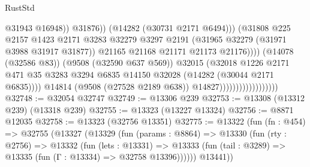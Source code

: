 \begin{lexlean}{RustStd}
\begin{coremodule}
                                                          @31943
                                                          @16948))
                                                      @31876))
                                                  (@14282 (@30731 @2171 @6494)))
                                                (@31808
                                                  @225
                                                  @2157
                                                  @1423
                                                  @2171
                                                  @3283
                                                  @32279
                                                  @3297
                                                  @2191
                                                  (@31965 @32279 (@31971 @3988 @31917 @31877))
                                                  @21165
                                                  @21168
                                                  @21171
                                                  @21173
                                                  @21176))))
                                          (@14078 (@32586 @83))
                                          (@9508 (@32590 @637 @569))
                                          @32015
                                          (@32018
                                            @1226
                                            @2171
                                            @471
                                            @35
                                            @3283
                                            @3294
                                            @6835
                                            @14150
                                            @32028
                                            (@14282 (@30044 @2171 @6835))))
                                        @14814
                                        (@9508 (@27528 @2189 @638))
                                        @14827))))))))))))))))))
@32748 := @32054 @32747
@32749 := @13306 @239
@32753 := @13308 (@13312 @239) (@13318 @239)
@32755 := @13323 (@13227 @13324)
@32756 := @8871 @12035
@32758 := @13323 (@32756 @13351)
@32775 := @13322
    (fun (fn : @454) =>
    @32755
      (@13327
        (@13329
          (fun (params : @8864) =>
          @13330
            (fun (rty : @2756) =>
            @13332
              (fun (lets : @13331) =>
              @13333 (fun (tail : @3289) => @13335 (fun (Γ : @13334) => @32758 @13396))))))
        @13441))

\end{coremodule}
\end{lexlean}
